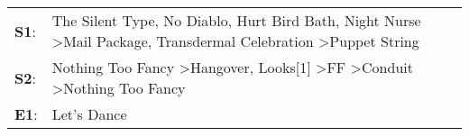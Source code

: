 \begin{supertabular}{p{0.03\textwidth}p{0.92\textwidth}}
 \textbf{S1}:  &  The Silent Type\textsuperscript{}, \enspace No Diablo\textsuperscript{}, \enspace Hurt Bird Bath\textsuperscript{}, \enspace Night Nurse\textsuperscript{} \textgreater \enspace Mail Package\textsuperscript{}, \enspace Transdermal Celebration\textsuperscript{} \textgreater \enspace Puppet String\textsuperscript{}  \enspace  \\
 \textbf{S2}:  &                                             Nothing Too Fancy\textsuperscript{} \textgreater \enspace Hangover\textsuperscript{}, \enspace Looks[1]\textsuperscript{} \textgreater \enspace FF\textsuperscript{} \textgreater \enspace Conduit\textsuperscript{} \textgreater \enspace Nothing Too Fancy\textsuperscript{}  \enspace  \\
 \textbf{E1}:  &                                                                                                                                                                                                                                                                                              Let's Dance\textsuperscript{}  \enspace  \\
\end{supertabular}
